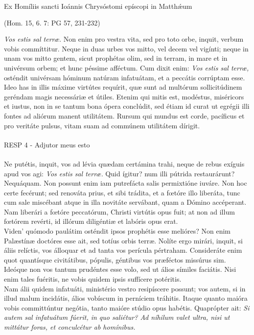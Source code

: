 \documentclass[options]{article}
\begin{document}
	Ex Homíliis sancti Ioánnis Chrysóstomi epíscopi in Matth\'{æ}um 
	\begin{flushright}
		(Hom. 15, 6. 7: PG 57, 231-232)
	\end{flushright}
	\emph{Vos estis sal terræ.} Non enim pro vestra vita, sed pro toto orbe, inquit, verbum vobis commíttitur. Neque in duas urbes vos mitto, vel decem vel vigínti; neque in unam vos mitto gentem, sicut prophétas olim, sed in terram, in mare et in univérsum orbem; et hunc péssime afféctum. Cum dixit enim: 
	\emph{Vos estis sal terræ,}
	osténdit univérsam hóminum natúram infatuátam, et a peccátis corrúptam esse. Ideo has in illis máxime virtútes requírit, quæ sunt ad multórum sollicitúdinem geréndam magis necessáriæ et útiles. Etenim qui mitis est, modéstus, miséricors et iustus, non in se tantum bona ópera conclúdit, sed étiam id curat ut egrégii illi fontes ad aliórum manent utilitátem. Rursum qui mundus est corde, pacíficus et pro veritáte pulsus, vitam suam ad commúnem utilitátem dírigit.\\
	\\
	RESP 4  - Adjutor meus esto \\
	\\
	Ne putétis, inquit, vos ad lévia quædam certámina trahi, neque de rebus exíguis apud vos agi: 
		\emph{Vos estis sal terræ.}
		Quid ígitur? num illi pútrida restaurárunt? Nequáquam. Non possunt enim iam putrefácta salis permixtióne iuváre. Non hoc certe fecérunt; sed renováta prius, et sibi trádita, et a fœtóre illo liberáta, tunc cum sale miscébant atque in illa novitáte servábant, quam a Dómino accéperant. Nam liberári a fœtóre peccatórum, Christi virtútis opus fuit; at non ad illum fœtórem revérti, id illórum diligéntiæ et labóris opus erat.\\
		Viden’ quómodo paulátim osténdit ipsos prophétis esse melióres? Non enim Palæstínæ doctóres esse ait, sed totíus orbis terræ. Nolíte ergo mirári, inquit, si áliis relíctis, vos álloquar et ad tanta vos perícula pértraham. Consideráte enim quot quantísque civitátibus, pópulis, géntibus vos præféctos missúrus sim. Ideóque non vos tantum prudéntes esse volo, sed ut álios símiles faciátis. Nisi enim tales fuéritis, ne vobis quidem ipsis suffícere potéritis.\\
		Nam álii quidem infatuáti, ministério vestro resipíscere possunt; vos autem, si in illud malum incidátis, álios vobíscum in perníciem tráhitis. Itaque quanto maióra vobis committúntur negótia, tanto maióre stúdio opus habétis. Quaprópter ait: 
		\emph{Si autem sal infatuátum fúerit, in quo saliétur? Ad níhilum valet ultra, nisi ut mittátur foras, et conculcétur ab homínibus.}\\
\end{document}
